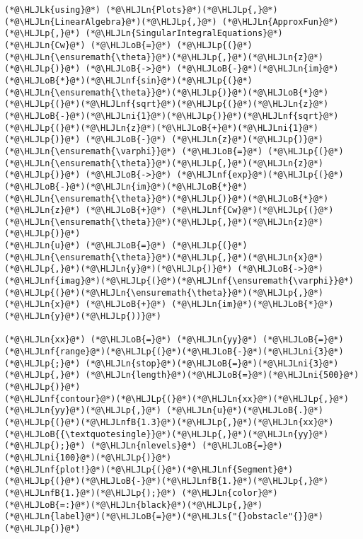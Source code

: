 \documentclass[12pt,landscape]{article}
\newcommand{\HLJLk}[1]{\textcolor[RGB]{148,91,176}{\textbf{#1}}}
\newcommand{\HLJLn}[1]{#1}
\newcommand{\HLJLnf}[1]{\textcolor[RGB]{66,102,213}{#1}}
\newcommand{\HLJLs}[1]{\textcolor[RGB]{201,61,57}{#1}}
\newcommand{\HLJLnfB}[1]{\textcolor[RGB]{59,151,46}{#1}}
\newcommand{\HLJLni}[1]{\textcolor[RGB]{59,151,46}{#1}}
\newcommand{\HLJLoB}[1]{\textcolor[RGB]{102,102,102}{\textbf{#1}}}
\newcommand{\HLJLp}[1]{#1}
\begin{document}
{\begin{lstlisting}
(*@\HLJLk{using}@*) (*@\HLJLn{Plots}@*)(*@\HLJLp{,}@*) (*@\HLJLn{LinearAlgebra}@*)(*@\HLJLp{,}@*) (*@\HLJLn{ApproxFun}@*)(*@\HLJLp{,}@*) (*@\HLJLn{SingularIntegralEquations}@*)
(*@\HLJLn{Cw}@*) (*@\HLJLoB{=}@*) (*@\HLJLp{(}@*)(*@\HLJLn{\ensuremath{\theta}}@*)(*@\HLJLp{,}@*)(*@\HLJLn{z}@*)(*@\HLJLp{)}@*) (*@\HLJLoB{->}@*) (*@\HLJLoB{-}@*)(*@\HLJLn{im}@*)(*@\HLJLoB{*}@*)(*@\HLJLnf{sin}@*)(*@\HLJLp{(}@*)(*@\HLJLn{\ensuremath{\theta}}@*)(*@\HLJLp{)}@*)(*@\HLJLoB{*}@*)(*@\HLJLp{(}@*)(*@\HLJLnf{sqrt}@*)(*@\HLJLp{(}@*)(*@\HLJLn{z}@*)(*@\HLJLoB{-}@*)(*@\HLJLni{1}@*)(*@\HLJLp{)}@*)(*@\HLJLnf{sqrt}@*)(*@\HLJLp{(}@*)(*@\HLJLn{z}@*)(*@\HLJLoB{+}@*)(*@\HLJLni{1}@*)(*@\HLJLp{)}@*) (*@\HLJLoB{-}@*) (*@\HLJLn{z}@*)(*@\HLJLp{)}@*)
(*@\HLJLn{\ensuremath{\varphi}}@*) (*@\HLJLoB{=}@*) (*@\HLJLp{(}@*)(*@\HLJLn{\ensuremath{\theta}}@*)(*@\HLJLp{,}@*)(*@\HLJLn{z}@*)(*@\HLJLp{)}@*) (*@\HLJLoB{->}@*) (*@\HLJLnf{exp}@*)(*@\HLJLp{(}@*)(*@\HLJLoB{-}@*)(*@\HLJLn{im}@*)(*@\HLJLoB{*}@*)(*@\HLJLn{\ensuremath{\theta}}@*)(*@\HLJLp{)}@*)(*@\HLJLoB{*}@*)(*@\HLJLn{z}@*) (*@\HLJLoB{+}@*) (*@\HLJLnf{Cw}@*)(*@\HLJLp{(}@*)(*@\HLJLn{\ensuremath{\theta}}@*)(*@\HLJLp{,}@*)(*@\HLJLn{z}@*)(*@\HLJLp{)}@*)
(*@\HLJLn{u}@*) (*@\HLJLoB{=}@*) (*@\HLJLp{(}@*)(*@\HLJLn{\ensuremath{\theta}}@*)(*@\HLJLp{,}@*)(*@\HLJLn{x}@*)(*@\HLJLp{,}@*)(*@\HLJLn{y}@*)(*@\HLJLp{)}@*) (*@\HLJLoB{->}@*) (*@\HLJLnf{imag}@*)(*@\HLJLp{(}@*)(*@\HLJLnf{\ensuremath{\varphi}}@*)(*@\HLJLp{(}@*)(*@\HLJLn{\ensuremath{\theta}}@*)(*@\HLJLp{,}@*) (*@\HLJLn{x}@*) (*@\HLJLoB{+}@*) (*@\HLJLn{im}@*)(*@\HLJLoB{*}@*)(*@\HLJLn{y}@*)(*@\HLJLp{))}@*)

(*@\HLJLn{xx}@*) (*@\HLJLoB{=}@*) (*@\HLJLn{yy}@*) (*@\HLJLoB{=}@*) (*@\HLJLnf{range}@*)(*@\HLJLp{(}@*)(*@\HLJLoB{-}@*)(*@\HLJLni{3}@*)(*@\HLJLp{;}@*) (*@\HLJLn{stop}@*)(*@\HLJLoB{=}@*)(*@\HLJLni{3}@*) (*@\HLJLp{,}@*) (*@\HLJLn{length}@*)(*@\HLJLoB{=}@*)(*@\HLJLni{500}@*)(*@\HLJLp{)}@*)
(*@\HLJLnf{contour}@*)(*@\HLJLp{(}@*)(*@\HLJLn{xx}@*)(*@\HLJLp{,}@*) (*@\HLJLn{yy}@*)(*@\HLJLp{,}@*) (*@\HLJLn{u}@*)(*@\HLJLoB{.}@*)(*@\HLJLp{(}@*)(*@\HLJLnfB{1.3}@*)(*@\HLJLp{,}@*)(*@\HLJLn{xx}@*)(*@\HLJLoB{{\textquotesingle}}@*)(*@\HLJLp{,}@*)(*@\HLJLn{yy}@*)(*@\HLJLp{);}@*) (*@\HLJLn{nlevels}@*) (*@\HLJLoB{=}@*) (*@\HLJLni{100}@*)(*@\HLJLp{)}@*)
(*@\HLJLnf{plot!}@*)(*@\HLJLp{(}@*)(*@\HLJLnf{Segment}@*)(*@\HLJLp{(}@*)(*@\HLJLoB{-}@*)(*@\HLJLnfB{1.}@*)(*@\HLJLp{,}@*)(*@\HLJLnfB{1.}@*)(*@\HLJLp{);}@*) (*@\HLJLn{color}@*)(*@\HLJLoB{=:}@*)(*@\HLJLn{black}@*)(*@\HLJLp{,}@*) (*@\HLJLn{label}@*)(*@\HLJLoB{=}@*)(*@\HLJLs{"{}obstacle"{}}@*)(*@\HLJLp{)}@*)
\end{lstlisting}

}
\end{document}
